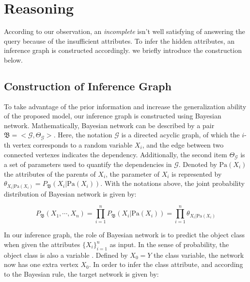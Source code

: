 \section{Reasoning}
\label{sec-reasoning}

According to our observation,  an {\em incomplete}  isn't well satisfying of answering the query because of the insufficient attributes.
To infer the hidden attributes, 
an inference graph is constructed accordingly.  
we briefly introduce the construction below. 

\subsection{Construction of Inference Graph}
To take advantage of the prior information and increase the generalization ability of the proposed model, our inference graph is constructed using Bayesian network.
Mathematically, Bayesian network \cite{friedman1997bayesian} can be described by a pair $\mathfrak{B}=<\mathcal{G},\varTheta_\mathcal{G}>$. 
Here, the notation $\mathcal{G}$ is a directed acyclic graph, of which the $i$-th vertex corresponds to a random variable $X_i$, and the edge between two connected vertexes indicates the dependency. 
Additionally, the second item $\varTheta_\mathcal{G}$ is a set of parameters used to quantify the dependencies in $\mathcal{G}$.
Denoted by $\text{Pa}(X_i)$ the attributes of the parents of $X_i$, 
the parameter of $X_i$ is represented by  $\theta_{X_i | \text{Pa}(X_i)} = P_\mathfrak{B}(X_i| \text{Pa}{(X_i)})$.
With the notations above, the joint probability distribution of Bayesian network is given by:

\begin{equation}\label{eq:BNOri}
P_\mathfrak{B}(X_1, \cdots, X_n) = 
\prod_{i=1}^{n} P_\mathfrak{B}(X_i| \text{Pa}{(X_i)})=
\prod_{i=1}^{n} \theta_{X_i | \text{Pa}(X_i)}
\end{equation}
\vspace{-1ex}

In our inference graph, the role of Bayesian network is to predict the object class when given the attributes $\{X_i\}_{i=1}^n$ as input. In the sense of probability, the object class is also a variable \cite{koller2009probabilistic}.
Defined by $X_0=Y$ the class variable, the network now has one extra vertex $X_0$.
In order to infer the class attribute, and according to the Bayesian rule, the target network is given by:

